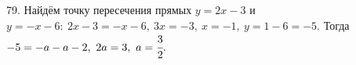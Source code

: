 79. Найдём точку пересечения прямых $y=2x-3$ и $y=-x-6:\ 2x-3=-x-6,\ 3x=-3,\ x=-1,\ y=1-6=-5.$ Тогда $-5=-a-a-2,\ 2a=3,\ a=\cfrac{3}{2}.$\\
